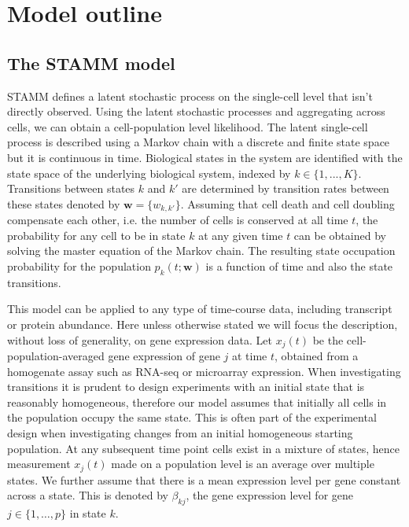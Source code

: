 \section{Model outline}
\label{sec:method}

\subsection{The STAMM model}
\label{sec:mast-model}


STAMM defines a latent stochastic process on the single-cell level that isn't directly observed. Using the latent stochastic processes and aggregating across cells, we can obtain a cell-population level likelihood. The latent single-cell process is described using a Markov chain with a discrete and finite state space but it is continuous in time. Biological states in the system are identified with the state space of the underlying biological system, indexed by $k \in \lbrace 1, ..., K \rbrace$. Transitions between states $k$ and $k'$ are determined by transition rates between these states denoted by $\mathbf{w} = \lbrace w_{k,k'} \rbrace $. Assuming that cell death and cell doubling compensate each other, i.e. the number of cells is conserved at all time $t$, the probability for any cell to be in state $k$ at any given time $t$ can be obtained by solving the master equation of the Markov chain. The resulting state occupation probability for the population $p_k(t;\mathbf{w})$ is a function of time and also the state transitions.

This model can be applied to any type of time-course data, including transcript or protein abundance. Here unless otherwise stated we will focus the description, without loss of generality, on gene expression data. Let $x_j(t)$ be the cell-population-averaged gene expression of gene $j$ at time $t$, obtained from a homogenate assay such as RNA-seq or microarray expression. When investigating transitions it is prudent to design experiments with an initial state that is reasonably homogeneous, therefore our model assumes that initially all cells in the population occupy the same state. This is often part of the experimental design when investigating changes from an initial homogeneous starting population. At any subsequent time point cells exist in a mixture of states, hence measurement $x_j(t)$ made on a population level is an average over multiple states. We further assume that there is a mean expression level per gene constant across a state. This is denoted by $\beta_{kj}$, the gene expression level for gene $j \in \lbrace 1, \ldots, p \rbrace$ in state $k$.

